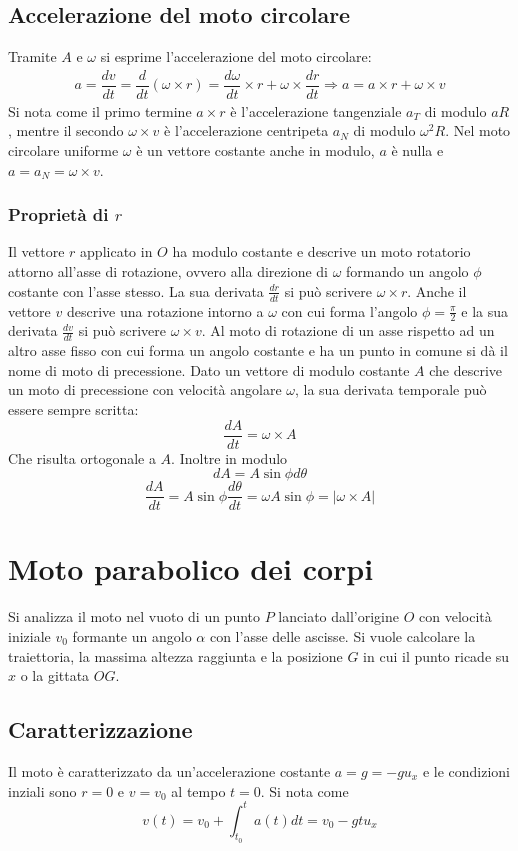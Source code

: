 \documentclass[class=book, crop=false, oneside, 12pt]{standalone}
\begin{document}
	\subsection{Accelerazione del moto circolare}
		Tramite $A$ e $\omega$ si esprime l'accelerazione del moto circolare:
		\begin{align*}
			a=\dfrac{dv}{dt}=\dfrac{d}{dt}(\omega\times r)=\dfrac{d\omega}{dt}\times r + \omega\times\dfrac{dr}{dt}\Rightarrow a=a\times r+\omega\times v
		\end{align*}
		Si nota come il primo termine $a\times r$ \`e l'accelerazione tangenziale $a_T$ di modulo $aR$, mentre il secondo $\omega\times v$ \`e l'accelerazione centripeta $a_N$ di modulo $\omega^2R$.
		Nel moto circolare uniforme $\omega$ \`e un vettore costante anche in modulo, $a$ \`e nulla e $a=a_N=\omega\times v$.
		\subsubsection{Propriet\`a di $r$}
		Il vettore $r$ applicato in $O$ ha modulo costante e descrive un moto rotatorio attorno all'asse di rotazione, ovvero alla direzione di $\omega$ formando un angolo $\phi$ costante con l'asse stesso.
		La sua derivata $\frac{dr}{dt}$ si pu\`o scrivere $\omega\times r$.
		Anche il vettore $v$ descrive una rotazione intorno a $\omega$ con cui forma l'angolo $\phi=\frac{\pi}{2}$ e la sua derivata $\frac{dv}{dt}$ si pu\`o scrivere $\omega\times v$.
		Al moto di rotazione di un asse rispetto ad un altro asse fisso con cui forma un angolo costante e ha un punto in comune si d\`a il nome di moto di precessione.
		Dato un vettore di modulo costante $A$ che descrive un moto di precessione con velocit\`a angolare $\omega$, la sua derivata temporale pu\`o essere sempre scritta:
		$$\dfrac{dA}{dt}=\omega\times A$$
		Che risulta ortogonale a $A$.
		Inoltre in modulo
		$$dA=A\sin\phi d\theta$$
		$$\dfrac{dA}{dt}=A\sin\phi\dfrac{d\theta}{dt}=\omega A\sin\phi=|\omega\times A|$$
\section{Moto parabolico dei corpi}
Si analizza il moto nel vuoto di un punto $P$ lanciato dall'origine $O$ con velocit\`a iniziale $v_0$ formante un angolo $\alpha$ con l'asse delle ascisse.
Si vuole calcolare la traiettoria, la massima altezza raggiunta e la posizione $G$ in cui il punto ricade su $x$ o la gittata $OG$.
	\subsection{Caratterizzazione}
	Il moto \`e caratterizzato da un'accelerazione costante $a=g=-gu_x$ e le condizioni inziali sono $r=0$ e $v=v_0$ al tempo $t=0$.
	Si nota come
	$$v(t)=v_0+\int_{t_0}^ta(t)dt=v_0-gtu_x$$
\end{document}
